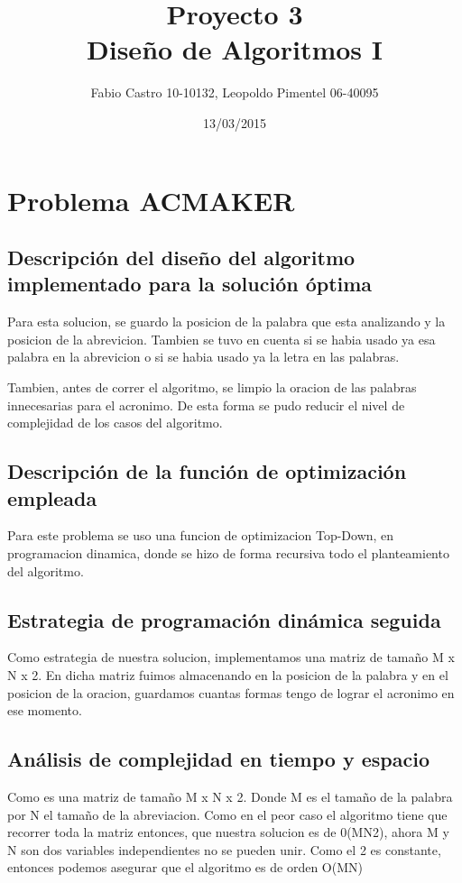 \documentclass[a4paper,10pt]{article}
\title{}
\author{}
\date{}
\begin{document}
 
\title{\Huge Proyecto 3 \protect\\ Diseño de Algoritmos I}
\author{Fabio Castro 10-10132, Leopoldo Pimentel 06-40095} 
\date{13/03/2015}
\maketitle


\section{Problema ACMAKER}

  \subsection{Descripción del diseño del algoritmo implementado para la solución óptima}
  \hspace{2cm}
    Para esta solucion, se guardo la posicion de la palabra que esta analizando y la posicion de la abrevicion. Tambien se tuvo en cuenta si se habia usado ya esa palabra en la abrevicion o si se habia usado ya la letra en las palabras. 

Tambien, antes de correr el algoritmo, se limpio la oracion de las palabras innecesarias para el acronimo. De esta forma se pudo reducir el nivel de complejidad de los casos del algoritmo.

  \subsection{Descripción de la función de optimización empleada}
  \hspace{2cm}
    Para este problema se uso una funcion de optimizacion Top-Down, en programacion dinamica, donde se hizo de forma recursiva todo el planteamiento del algoritmo.
    
  \subsection{Estrategia de programación dinámica seguida}
  \hspace{2cm}
    Como estrategia de nuestra solucion, implementamos una matriz de tamaño M x N x 2. En dicha matriz fuimos almacenando en la posicion de la palabra y en el posicion de la oracion, guardamos cuantas formas tengo de lograr el acronimo en ese momento.
  \subsection{Análisis de complejidad en tiempo y espacio}
  \hspace{2cm}
    Como es una matriz de tamaño M x N x 2. Donde M es el tamaño de la palabra por N el tamaño de la abreviacion.
Como en el peor caso el algoritmo tiene que recorrer toda la matriz entonces, que nuestra solucion es de 0(MN2), ahora M y N son dos variables independientes no se pueden unir. Como el 2 es constante, entonces podemos asegurar que el algoritmo es de orden O(MN) 
  
\end{document}
